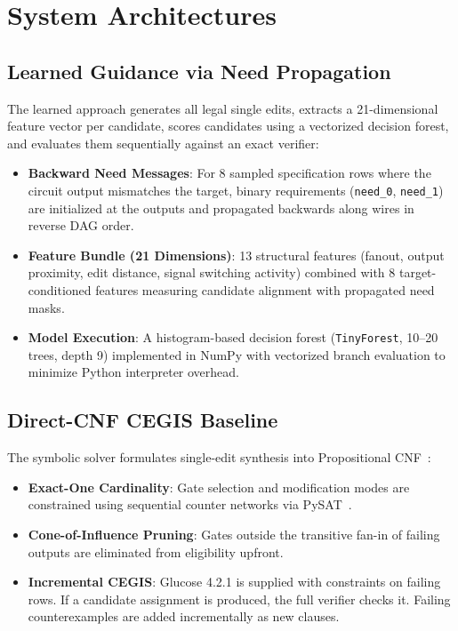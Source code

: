 \documentclass[10pt,journal,compsoc]{IEEEtran}
\begin{document}
\section{System Architectures}

\subsection{Learned Guidance via Need Propagation}
The learned approach generates all legal single edits, extracts a 21-dimensional feature vector per candidate, scores candidates using a vectorized decision forest, and evaluates them sequentially against an exact verifier:
\begin{itemize}
    \item \textbf{Backward Need Messages}: For 8 sampled specification rows where the circuit output mismatches the target, binary requirements (\texttt{need\_0}, \texttt{need\_1}) are initialized at the outputs and propagated backwards along wires in reverse DAG order.
    \item \textbf{Feature Bundle (21 Dimensions)}: 13 structural features (fanout, output proximity, edit distance, signal switching activity) combined with 8 target-conditioned features measuring candidate alignment with propagated need masks.
    \item \textbf{Model Execution}: A histogram-based decision forest (\texttt{TinyForest}, 10--20 trees, depth 9) implemented in NumPy with vectorized branch evaluation to minimize Python interpreter overhead.
\end{itemize}

\subsection{Direct-CNF CEGIS Baseline}
The symbolic solver formulates single-edit synthesis into Propositional CNF~\cite{sinha2007cegis}:
\begin{itemize}
    \item \textbf{Exact-One Cardinality}: Gate selection and modification modes are constrained using sequential counter networks via PySAT~\cite{ignatiev2018pysat}.
    \item \textbf{Cone-of-Influence Pruning}: Gates outside the transitive fan-in of failing outputs are eliminated from eligibility upfront.
    \item \textbf{Incremental CEGIS}: Glucose 4.2.1 is supplied with constraints on failing rows. If a candidate assignment is produced, the full verifier checks it. Failing counterexamples are added incrementally as new clauses.
\end{itemize}
\end{document}
